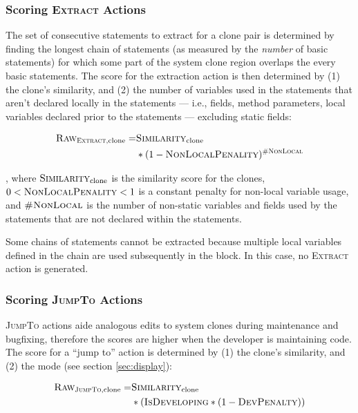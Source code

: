 \documentclass[nocopyrightspace,10pt]{sigplanconf}
\begin{document}
\subsubsection{Scoring \textsc{Extract} Actions}
\label{sec:extract}
The set of consecutive statements to extract for a clone pair is
determined by finding the longest chain of statements (as measured by
the \textit{number} of basic statements) for which some part of the
system clone region overlaps the every basic statements.
The score for the extraction
action is then determined by (1) the clone's similarity, and (2) the
number of variables used in the statements that aren't declared
locally in the statements --- i.e., fields, method parameters, local
variables declared prior to the statements --- excluding static
fields:

\begin{align*}
  \textsc{Raw}_{\textsc{Extract}, \text{clone}} = & \textsc{Similarity}_{\text{clone}} \\ 
   & * (1 - \textsc{NonLocalPenality})^{\textsc{\#NonLocal}}
\end{align*}

\noindent, where $\textsc{Similarity}_{\text{clone}}$ is the
similarity score for the clones, $0 < \textsc{NonLocalPenality} < 1$
is a constant penalty for non-local variable usage, and
$\textsc{\#NonLocal}$ is the number of non-static variables and fields
used by the statements that are not declared within the statements.

Some chains of statements cannot be extracted because multiple local
variables defined in the chain are used subsequently in the block. In
this case, no \textsc{Extract} action is generated.

\subsubsection{Scoring \textsc{JumpTo} Actions}
\textsc{JumpTo} actions aide analogous edits to system clones
during maintenance and bugfixing, therefore the scores are higher when
the developer is maintaining code. The score for a ``jump to'' action
is determined by (1) the clone's similarity, and (2) the mode (see
section \ref{sec:display}):

\begin{align*}
  \textsc{Raw}_{\textsc{JumpTo}, \text{clone}} = & \textsc{Similarity}_{\text{clone}} \\ 
   & * (\textsc{IsDeveloping} * (1 - \textsc{DevPenalty}))
\end{align*}
\end{document}
